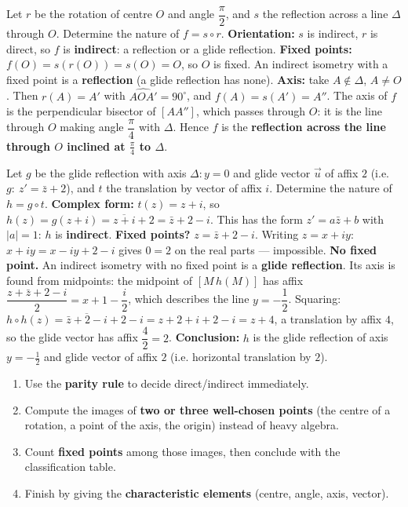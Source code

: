 \documentclass[11pt]{article}
\begin{document}
\begin{exoresolu}
Let $r$ be the rotation of centre $O$ and angle $\dfrac{\pi}{2}$, and $s$ the reflection across a line $\Delta$ through $O$. Determine the nature of $f = s\circ r$.
\tcblower
\textbf{Orientation:} $s$ is indirect, $r$ is direct, so $f$ is \textbf{indirect}: a reflection or a glide reflection.
\textbf{Fixed points:} $f(O) = s(r(O)) = s(O) = O$, so $O$ is fixed. An indirect isometry with a fixed point is a \textbf{reflection} (a glide reflection has none).
\textbf{Axis:} take $A\notin\Delta$, $A\neq O$. Then $r(A)=A'$ with $\widehat{AOA'}=90^\circ$, and $f(A)=s(A')=A''$. The axis of $f$ is the perpendicular bisector of $[AA'']$, which passes through $O$: it is the line through $O$ making angle $\dfrac{\pi}{4}$ with $\Delta$. Hence $f$ is the \textbf{reflection across the line through $O$ inclined at $\frac{\pi}{4}$ to $\Delta$}.
\end{exoresolu}

\begin{exoresolu}
Let $g$ be the glide reflection with axis $\Delta: y=0$ and glide vector $\vec{u}$ of affix $2$ (i.e. $g:\ z' = \bar z + 2$), and $t$ the translation by vector of affix $i$. Determine the nature of $h = g\circ t$.
\tcblower
\textbf{Complex form:} $t(z) = z+i$, so $h(z) = g(z+i) = \overline{z+i}+2 = \bar z + 2 - i$. This has the form $z' = a\bar z + b$ with $|a|=1$: $h$ is \textbf{indirect}.
\textbf{Fixed points?} $z = \bar z + 2 - i$. Writing $z=x+iy$: $x+iy = x - iy + 2 - i$ gives $0 = 2$ on the real parts — impossible. \textbf{No fixed point.}
An indirect isometry with no fixed point is a \textbf{glide reflection}. Its axis is found from midpoints: the midpoint of $[M\,h(M)]$ has affix $\dfrac{z+\bar z+2-i}{2} = x + 1 - \dfrac{i}{2}$, which describes the line $y = -\dfrac{1}{2}$. Squaring: $h\circ h(z) = \overline{\bar z + 2 - i}+2-i = z + 2 + i + 2 - i = z + 4$, a translation by affix $4$, so the glide vector has affix $\dfrac{4}{2} = 2$. \textbf{Conclusion:} $h$ is the glide reflection of axis $y=-\tfrac12$ and glide vector of affix $2$ (i.e. horizontal translation by $2$).
\end{exoresolu}

\begin{methode}
\begin{enumerate}
\item Use the \textbf{parity rule} to decide direct/indirect immediately.
\item Compute the images of \textbf{two or three well-chosen points} (the centre of a rotation, a point of the axis, the origin) instead of heavy algebra.
\item Count \textbf{fixed points} among those images, then conclude with the classification table.
\item Finish by giving the \textbf{characteristic elements} (centre, angle, axis, vector).
\end{enumerate}
\end{methode}
\end{document}
